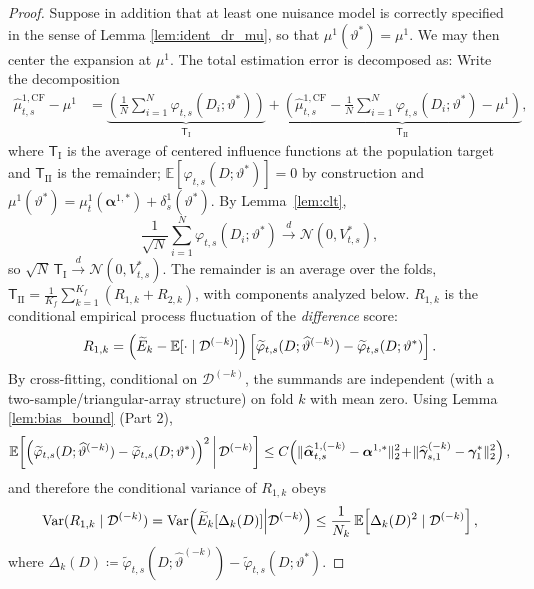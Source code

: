 \documentclass{article}
\begin{document}
\begin{proof}
Suppose in addition that at least one nuisance model is correctly specified in the sense of Lemma \ref{lem:ident_dr_mu}, so that $\mu^1(\vartheta^*)=\mu^1$. We may then center the expansion at $\mu^1$.
The total estimation error is decomposed as:
Write the decomposition
\[
\begin{aligned}
\widehat{\mu}^{1,\mathrm{CF}}_{t,s} - \mu^1
&= \underbrace{\left(\frac{1}{N}\sum_{i=1}^{N} \varphi_{t,s}(D_i; \vartheta^*)\right)}_{\displaystyle \mathsf{T}_{\mathrm{I}}}
+ \underbrace{\left(\widehat{\mu}^{1,\mathrm{CF}}_{t,s} - \frac{1}{N}\sum_{i=1}^{N} \varphi_{t,s}(D_i; \vartheta^*) - \mu^1\right)}_{\displaystyle \mathsf{T}_{\mathrm{II}}},
\end{aligned}
\]
where $\mathsf{T}_{\mathrm{I}}$ is the average of centered influence functions at the population target and $\mathsf{T}_{\mathrm{II}}$ is the remainder; $\mathbb{E}[\varphi_{t,s}(D;\vartheta^*)]=0$ by construction and $\mu^1(\vartheta^*)=\mu^1_t(\boldsymbol{\alpha}^{1,*})+\delta^1_s(\vartheta^*)$.
By Lemma~\ref{lem:clt},
\[
\frac{1}{\sqrt{N}}\sum_{i=1}^{N}\varphi_{t,s}(D_i; \vartheta^*) \xrightarrow{d} \mathcal{N}(0, V^*_{t,s}),
\]
so $\sqrt{N}\,\mathsf{T}_{\mathrm{I}}\xrightarrow{d}\mathcal{N}(0,V^*_{t,s})$.
The remainder is an average over the folds, $\mathsf{T}_{\mathrm{II}}=\frac{1}{K_f}\sum_{k=1}^{K_f}(R_{1,k}+R_{2,k})$, with components analyzed below.
$R_{1,k}$ is the conditional empirical process fluctuation of the \emph{difference} score:
\[
R_{1,k} = \left(\widetilde{E}_k - \operatorname{\mathbb{E}}[\cdot \mid \mathcal{D}^{(-k)}]\right)\left[
\widetilde{\varphi}_{t,s}(D; \widehat{\vartheta}^{(-k)}) - \widetilde{\varphi}_{t,s}(D; \vartheta^*)
\right].
\]
By cross-fitting, conditional on $\mathcal{D}^{(-k)}$, the summands are independent (with a two-sample/triangular-array structure) on fold $k$ with mean zero. Using Lemma \ref{lem:bias_bound} (Part 2),
\[
\operatorname{\mathbb{E}}\!\left[\left(\widetilde{\varphi}_{t,s}(D; \widehat{\vartheta}^{(-k)}) - \widetilde{\varphi}_{t,s}(D; \vartheta^*)\right)^2 \,\middle|\, \mathcal{D}^{(-k)}\right]
\le C\!\left(\|\widehat{\boldsymbol{\alpha}}_{t,s}^{1,(-k)}-\boldsymbol{\alpha}^{1,*}\|_2^2
\!+\!
\|\widehat{\boldsymbol{\gamma}}_{s,1}^{(-k)}-\boldsymbol{\gamma}_{1}^{*}\|_2^2\right),
\]
and therefore the conditional variance of $R_{1,k}$ obeys
\[
\operatorname{Var}(R_{1,k}\mid \mathcal{D}^{(-k)})
=
\operatorname{Var}\!\left(
\widetilde{E}_k\!\left[\Delta_k(D)\right]\middle|\mathcal{D}^{(-k)}
\right)
\le
\frac{1}{N_k}\operatorname{\mathbb{E}}\!\left[\Delta_k(D)^2\mid \mathcal{D}^{(-k)}\right],
\]
where $\Delta_k(D)\coloneqq \widetilde{\varphi}_{t,s}(D; \widehat{\vartheta}^{(-k)}) - \widetilde{\varphi}_{t,s}(D; \vartheta^*)$.

\end{proof}
\end{document}
